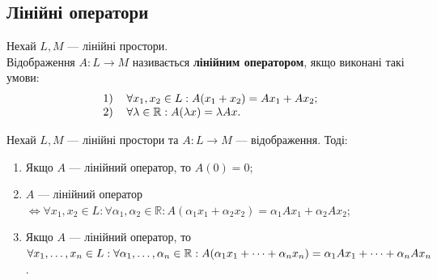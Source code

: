 \documentclass{math_library}
\begin{document}
	\subsection{Лінійні оператори}
	\begin{definition}
	Нехай $L,M$ --- лінійні простори.\\
	Відображення $A \colon L \to M$ називається \textbf{лінійним оператором}, якщо виконані такі умови:
	\begin{align*}
	\begin{tabular}{cl}
	1) & $\forall x_1,x_2 \in L: A(x_1+x_2)=Ax_1+Ax_2$;\\
	2) & $\forall \lambda \in \mathbb{R}: A(\lambda x) = \lambda Ax$.
	\end{tabular}
	\end{align*}
	\end{definition}
	
	\begin{proposition}
	Нехай $L,M$ --- лінійні простори та $A \colon L \to M$ --- відображення. Тоді:
	\begin{enumerate}[nosep, wide=0pt, label={\arabic*)}]
	\item Якщо $A$ --- лінійний оператор, то $A(0) = 0$;
	\item $A$ --- лінійний оператор $\iff \forall x_1,x_2 \in L: \forall \alpha_1, \alpha_2 \in \mathbb{R}: A(\alpha_1 x_1 + \alpha_2 x_2) = \alpha_1 Ax_1 + \alpha_2 Ax_2$;
	\item Якщо $A$ --- лінійний оператор, то $\forall x_1,\dots, x_n \in L: \forall \alpha_1, \dots, \alpha_n \in \mathbb{R}: \\ A(\alpha_1 x_1 + \dots + \alpha_n x_n) = \alpha_1 Ax_1 + \dots + \alpha_n Ax_n$.
	\end{enumerate}
	\end{proposition}
	
\end{document}
